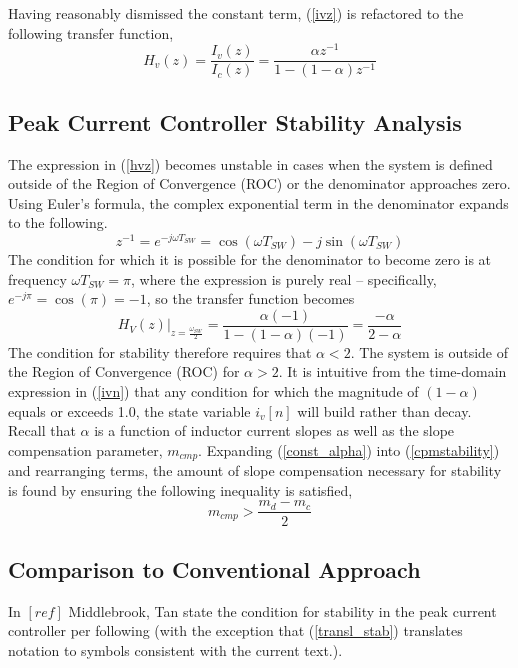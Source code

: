 \documentclass[conference]{IEEEtran}
\begin{document}
Having reasonably dismissed the constant term, (\ref{ivz}) is refactored to the following transfer function,
\begin{equation}
H_v(z) = \frac {I_v(z)} {I_c(z)} = \frac {\alpha z^{-1}} {1 - (1-\alpha) z^{-1}}  \label{hvz}
\end{equation}


\subsection{Peak Current Controller Stability Analysis}

The expression in (\ref{hvz}) becomes unstable in cases when the system is defined outside of the Region of Convergence (ROC) or the denominator approaches zero. Using Euler's formula, the complex exponential term in the denominator expands to the following.
\begin{equation}
	z^{-1} = e^{-j \omega T_{SW}} = \cos (\omega T_{SW}) - j \sin (\omega T_{SW}) 
\end{equation} 
The condition for which it is possible for the denominator to become zero is at frequency $\omega T_{SW} = \pi$, where the expression is purely real -- specifically, $e^{-j \pi} = \cos ( \pi) = -1$, so the transfer function becomes
\begin{equation}
H_V(z) \bigg|_{z=\frac{\omega_{SW}}{2}} = \dfrac{\alpha (-1)}{1 - (1 - \alpha) (-1)} = \dfrac{- \alpha}{2 - \alpha} \label{cpmstability}
\end{equation}
The condition for stability therefore requires that $\alpha < 2$.  The system is outside of the Region of Convergence (ROC) for $\alpha > 2$. It is intuitive from the time-domain expression in (\ref{ivn}) that any condition for which the magnitude of $(1 - \alpha)$ equals or exceeds 1.0, the state variable $i_v[n]$ will build rather than decay.
Recall that $\alpha$ is a function of inductor current slopes as well as the slope compensation parameter, $m_{cmp}$.  Expanding (\ref{const_alpha}) into (\ref{cpmstability}) and rearranging terms, the amount of slope compensation necessary for stability is found by ensuring the following inequality is satisfied,
\begin{equation}
m_{cmp} > \dfrac{m_d - m_c}{2} \label{slope_stab}
\end{equation}

\subsection{Comparison to Conventional Approach}
In $[ref]$ Middlebrook, Tan state the condition for stability in the peak current controller per following (with the exception that (\ref{transl_stab}) translates notation to symbols consistent with the current text.).
\end{document}
